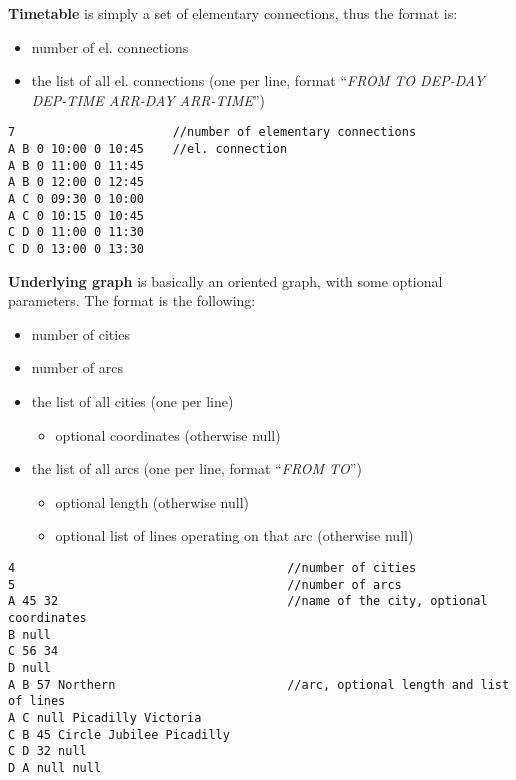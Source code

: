 \noindent \textbf{Timetable} is simply a set of elementary connections, thus the format is:
\begin{itemize}
	\item number of el. connections
	\item the list of all el. connections (one per line, format ``\textit{FROM TO DEP-DAY DEP-TIME ARR-DAY ARR-TIME}'')
\end{itemize}
\hspace*{\fill}

\begin{lstlisting}[caption={TT file format.}]
7                      //number of elementary connections
A B 0 10:00 0 10:45    //el. connection
A B 0 11:00 0 11:45
A B 0 12:00 0 12:45
A C 0 09:30 0 10:00
A C 0 10:15 0 10:45
C D 0 11:00 0 11:30
C D 0 13:00 0 13:30
\end{lstlisting}

\noindent \textbf{Underlying graph} is basically an oriented graph, with some optional parameters. The format is the following:
\begin{itemize}
	\item number of cities
	\item number of arcs
	\item the list of all cities  (one per line)
	\begin{itemize}
		\item optional coordinates (otherwise null)
	\end{itemize}
	\item the list of all arcs (one per line, format ``\textit{FROM TO}'')
	\begin{itemize}
		\item optional length (otherwise null)
		\item optional list of lines operating on that arc (otherwise null)
	\end{itemize}
\end{itemize}
\hspace*{\fill}
			
\begin{lstlisting}[caption={UG file format.}]
4                                      //number of cities
5                                      //number of arcs
A 45 32                                //name of the city, optional coordinates
B null
C 56 34
D null
A B 57 Northern                        //arc, optional length and list of lines 
A C null Picadilly Victoria            
C B 45 Circle Jubilee Picadilly
C D 32 null                          
D A null null
\end{lstlisting}

